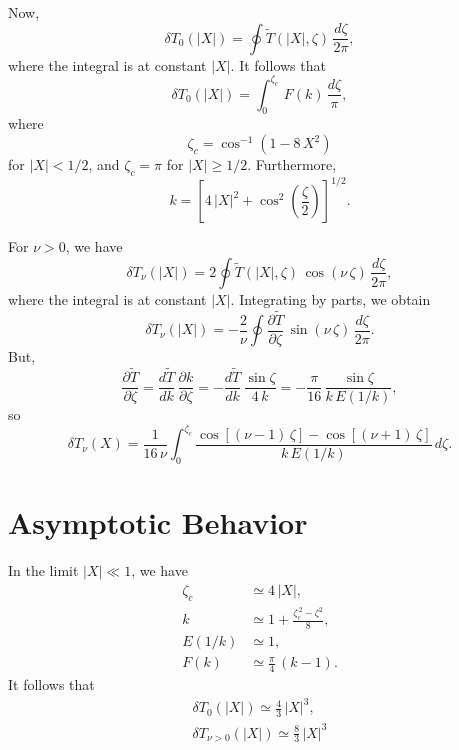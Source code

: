 \documentclass[12pt,prb,aps,notitlepage]{revtex4-1}
\begin{document}
Now,
\begin{equation}
\delta T_{0}(|X|) = \oint\tilde{T}(|X|,\zeta)\,\frac{d\zeta}{2\pi},
\end{equation}
where the integral is at constant $|X|$. It follows that
\begin{equation}
\delta T_0(|X|) =  \int_0^{\zeta_c}\,F(k)\,\frac{d\zeta}{\pi},
\end{equation}
where 
\begin{equation}
\zeta_c = \cos^{-1}\left(1-8\,X^2\right)
\end{equation}
for $|X|< 1/2$, and $\zeta_c=\pi$ for $|X|\geq 1/2$. Furthermore, 
\begin{equation}
k = \left[4\,|X|^2+\cos^2\left(\frac{\zeta}{2}\right)\right]^{1/2}.
\end{equation}

For $\nu>0$, we have
\begin{equation}
\delta T_\nu(|X|) = 2\oint \tilde{T}(|X|,\zeta)\,\cos(\nu\,\zeta)\,\frac{d\zeta}{2\pi},
\end{equation}
where the integral is at constant $|X|$. Integrating by parts, we obtain
\begin{equation}
\delta T_\nu(|X|) =-\frac{2}{\nu}\oint\frac{\partial\tilde{T}}{\partial \zeta}\,\sin(\nu\,\zeta)\,\frac{d\zeta}{2\pi}.
\end{equation}
But,
\begin{equation}
\frac{\partial\tilde{T}}{\partial \zeta}=\frac{d\tilde{T}}{dk}\,\frac{\partial k}{\partial\zeta}=-\frac{d\tilde{T}}{dk}\,\frac{\sin\zeta}{4\,k} = -\frac{\pi}{16}\,\frac{\sin\zeta}{k\,E(1/k)},
\end{equation}
so
\begin{equation}
\delta T_\nu(X) =\frac{1}{16\,\nu} \int_0^{\zeta_c}\frac{\cos[(\nu-1)\,\zeta]-\cos[(\nu+1)\,\zeta]}{k\,E(1/k)}\,d\zeta.
\end{equation}

\section{Asymptotic Behavior}
In the limit $|X| \ll 1$, we have
\begin{align}
\zeta_c &\simeq 4\,|X|,\\[0.5ex]
k &\simeq 1 + \frac{\zeta_c^{\,2}-\zeta^2}{8},\\[0.5ex]
E(1/k)&\simeq 1,\\[0.5ex]
F(k)&\simeq \frac{\pi}{4}\,(k-1).
\end{align}
It follows that
\begin{align}
\delta T_0(|X|) \simeq \frac{4}{3}\,|X|^3,\\[0.5ex]
\delta T_{\nu>0}(|X|) \simeq \frac{8}{3}\,|X|^3
\end{align}
\end{document}
